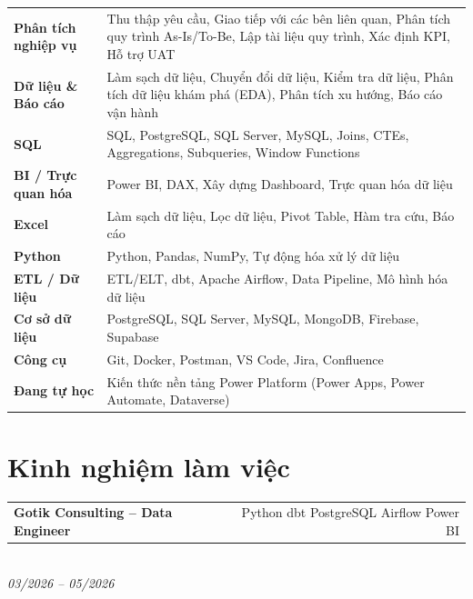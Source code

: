 \documentclass[10pt,a4paper]{article}
\newcommand{\entry}[3]{%
    \noindent
    \begin{tabularx}{\linewidth}{X r}
        \textbf{\color{primary}#1} &
        {\scriptsize\color{gray}#2}
    \end{tabularx}\\[-2pt]
    {\scriptsize\textit{\color{gray}#3}}
    \vspace{0.5pt}
}
\begin{document}
{\small

\begin{tabularx}{\linewidth}{@{}lX@{}}

\textbf{Phân tích nghiệp vụ}
&
Thu thập yêu cầu, Giao tiếp với các bên liên quan, Phân tích quy
trình As-Is/To-Be, Lập tài liệu quy trình, Xác định KPI, Hỗ trợ UAT
\\[1pt]

\textbf{Dữ liệu \& Báo cáo}
&
Làm sạch dữ liệu, Chuyển đổi dữ liệu, Kiểm tra dữ liệu, Phân tích dữ
liệu khám phá (EDA), Phân tích xu hướng, Báo cáo vận hành
\\[1pt]

\textbf{SQL}
&
SQL, PostgreSQL, SQL Server, MySQL, Joins, CTEs, Aggregations,
Subqueries, Window Functions
\\[1pt]

\textbf{BI / Trực quan hóa}
&
Power BI, DAX, Xây dựng Dashboard, Trực quan hóa dữ liệu
\\[1pt]

\textbf{Excel}
&
Làm sạch dữ liệu, Lọc dữ liệu, Pivot Table, Hàm tra cứu, Báo cáo
\\[1pt]

\textbf{Python}
&
Python, Pandas, NumPy, Tự động hóa xử lý dữ liệu
\\[1pt]

\textbf{ETL / Dữ liệu}
&
ETL/ELT, dbt, Apache Airflow, Data Pipeline, Mô hình hóa dữ liệu
\\[1pt]

\textbf{Cơ sở dữ liệu}
&
PostgreSQL, SQL Server, MySQL, MongoDB, Firebase, Supabase
\\[1pt]

\textbf{Công cụ}
&
Git, Docker, Postman, VS Code, Jira, Confluence
\\[1pt]

\textbf{Đang tự học}
&
Kiến thức nền tảng Power Platform (Power Apps, Power Automate, Dataverse)

\end{tabularx}

}


\section*{Kinh nghiệm làm việc}

\entry
{Gotik Consulting -- Data Engineer}
{Python \textbar{} dbt \textbar{} PostgreSQL \textbar{} Airflow \textbar{} Power BI}
{03/2026 -- 05/2026}
\end{document}
